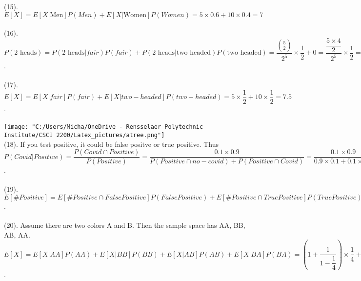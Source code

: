 \documentclass{article}
\begin{document}
(15). $E[X] = E[X|\text{Men}]P(Men) + E[X|\text{Women}]P(Women) = 5 \times 0.6 + 10 \times 0.4 = 7$\\\\
(16). $P(\text{2 heads})=P(\text{2 heads}|fair)P(fair)+P(\text{2 heads}|\text{two headed})P(\text{two headed}) = \dfrac{\binom{5}{2}}{2^5} \times \dfrac{1}{2} + 0 = \dfrac{\dfrac{5\times4}{2}}{2^5} \times \dfrac{1}{2} = \dfrac{5}{32}$.\\\\
(17). $E[X] = E[X|fair]P(fair)+E[X|two-headed]P(two-headed) = 5 \times \dfrac{1}{2}+10 \times \dfrac{1}{2} = 7.5$.\\\\
\texttt{[image: "C:/Users/Micha/OneDrive - Rensselaer Polytechnic Institute/CSCI 2200/Latex\_pictures/atree.png"]}\\
(18). If you test positive, it could be false positve or true positive. Thus $P(Covid|Positive) = \dfrac{P(Covid \cap Positive)}{P(Positive)} = \dfrac{0.1 \times 0.9}{P(Positive \cap no-covid)+P(Positive \cap Covid)} = \dfrac{0.1 \times 0.9}{0.9 \times 0.1 + 0.1 \times 0.9} = \dfrac{1}{2} = 50\% $.\\\\
(19). $E[\#Positive] = E[\#Positive \cap FalsePositive]P(FalsePositive)+E[\#Positive \cap TruePositive]P(TruePositive) = 100 \times 0.1 \times 0.9 + 100 \times 0.1 \times 0.9 = 18$.\\\\
(20). Assume there are two colors A and B. Then the sample space has AA, BB, AB, AA. $E[X] = E[X|AA]P(AA)+E[X|BB]P(BB)+E[X|AB]P(AB)+E[X|BA]P(BA) = (1+\dfrac{1}{1-\dfrac{1}{4}}) \times \dfrac{1}{4} + (1+\dfrac{1}{1-\dfrac{1}{4}}) \times \dfrac{1}{4} + 1 \times \dfrac{1}{4} + \dfrac{1}{4} \times 1 = (1+\dfrac{4}{3}) \times \dfrac{1}{4} \times 2 + \dfrac{1}{2} = \dfrac{7}{3} \dfrac{1}{2} + \dfrac{1}{2} = \dfrac{10}{6} = \dfrac{5}{3}$.
\end{document}
